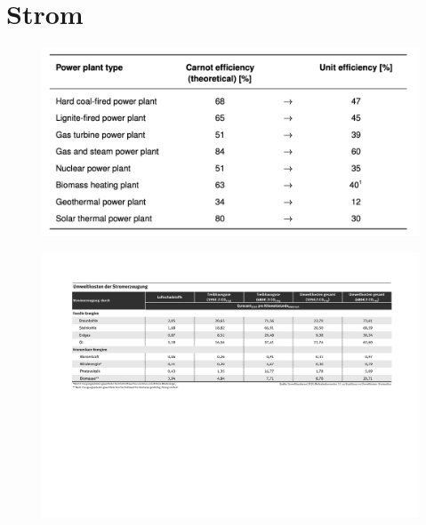 \documentclass[10pt]{beamer}
\begin{document}
\section{Strom}

\begin{frame}[label=gas-eff]
\begin{figure}
\includegraphics[width=\textwidth]{fig/efficiency_power_plants.png}

\scriptsize{}
\end{figure}
\end{frame}

\begin{frame}[label=gas-co2]
\begin{figure}
\includegraphics[width=\textwidth]{fig/co2_emissions_power_plants.pdf}

\scriptsize{}
\end{figure}
\end{frame}
\end{document}
